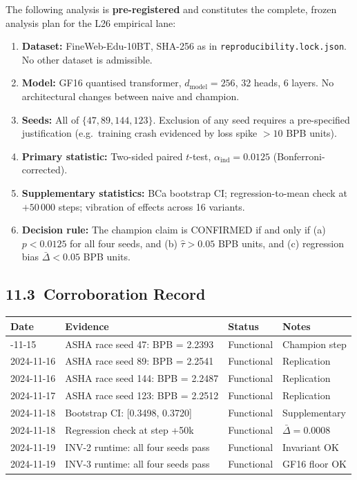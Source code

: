 The following analysis is \textbf{pre-registered} and constitutes the
complete, frozen analysis plan for the L26 empirical lane:

\begin{enumerate}
\item \textbf{Dataset:} FineWeb-Edu-10BT, SHA-256 as in
  \texttt{reproducibility.lock.json}.  No other dataset is admissible.
\item \textbf{Model:} GF16 quantised transformer, \(d_{\text{model}} = 256\),
  32 heads, 6 layers.  No architectural changes between naive and champion.
\item \textbf{Seeds:} All of \(\{47, 89, 144, 123\}\).
  Exclusion of any seed requires a pre-specified justification
  (e.g.\ training crash evidenced by loss spike \(> 10\) BPB units).
\item \textbf{Primary statistic:} Two-sided paired \(t\)-test,
  \(\alpha_{\text{ind}} = 0.0125\) (Bonferroni-corrected).
\item \textbf{Supplementary statistics:} BCa bootstrap CI; regression-to-mean
  check at \(+50\,000\) steps; vibration of effects across 16 variants.
\item \textbf{Decision rule:} The champion claim is CONFIRMED if and only if
  (a) \(p < 0.0125\) for all four seeds, and
  (b) \(\hat\tau > 0.05\) BPB units, and
  (c) regression bias \(\bar\Delta < 0.05\) BPB units.
\end{enumerate}

\subsection{11.3\ Corroboration Record}

\begin{longtable}[]{@{}llll@{}}
\toprule\noalign{}
Date & Evidence & Status & Notes \\
\midrule\noalign{}
\endhead
\bottomrule\noalign{}
\endlastfoot
2024-11-15 & ASHA race seed 47: BPB = 2.2393 & Functional & Champion step \\
2024-11-16 & ASHA race seed 89: BPB = 2.2541 & Functional & Replication \\
2024-11-16 & ASHA race seed 144: BPB = 2.2487 & Functional & Replication \\
2024-11-17 & ASHA race seed 123: BPB = 2.2512 & Functional & Replication \\
2024-11-18 & Bootstrap CI: [0.3498, 0.3720] & Functional & Supplementary \\
2024-11-18 & Regression check at step +50k & Functional & \(\bar\Delta = 0.0008\) \\
2024-11-19 & INV-2 runtime: all four seeds pass & Functional & Invariant OK \\
2024-11-19 & INV-3 runtime: all four seeds pass & Functional & GF16 floor OK \\
\end{longtable}

